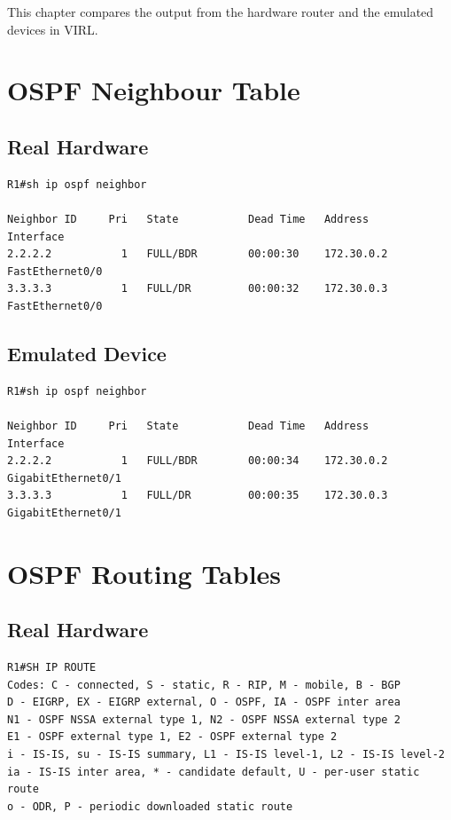\documentclass[11pt]{report}
\begin{document}
\begin{appendices}
This chapter compares the output from the hardware router and the emulated devices in VIRL.

\section{OSPF Neighbour Table}

\subsection{Real Hardware}

\begin{lstlisting}
R1#sh ip ospf neighbor

Neighbor ID     Pri   State           Dead Time   Address         Interface
2.2.2.2           1   FULL/BDR        00:00:30    172.30.0.2      FastEthernet0/0
3.3.3.3           1   FULL/DR         00:00:32    172.30.0.3      FastEthernet0/0
\end{lstlisting}

\subsection{Emulated Device}
\begin{lstlisting}
R1#sh ip ospf neighbor

Neighbor ID     Pri   State           Dead Time   Address         Interface
2.2.2.2           1   FULL/BDR        00:00:34    172.30.0.2      GigabitEthernet0/1
3.3.3.3           1   FULL/DR         00:00:35    172.30.0.3      GigabitEthernet0/1
\end{lstlisting}

\section{OSPF Routing Tables}

\subsection{Real Hardware}
\begin{lstlisting}
R1#SH IP ROUTE
Codes: C - connected, S - static, R - RIP, M - mobile, B - BGP
D - EIGRP, EX - EIGRP external, O - OSPF, IA - OSPF inter area
N1 - OSPF NSSA external type 1, N2 - OSPF NSSA external type 2
E1 - OSPF external type 1, E2 - OSPF external type 2
i - IS-IS, su - IS-IS summary, L1 - IS-IS level-1, L2 - IS-IS level-2
ia - IS-IS inter area, * - candidate default, U - per-user static route
o - ODR, P - periodic downloaded static route


\end{lstlisting}
\end{appendices}
\end{document}
